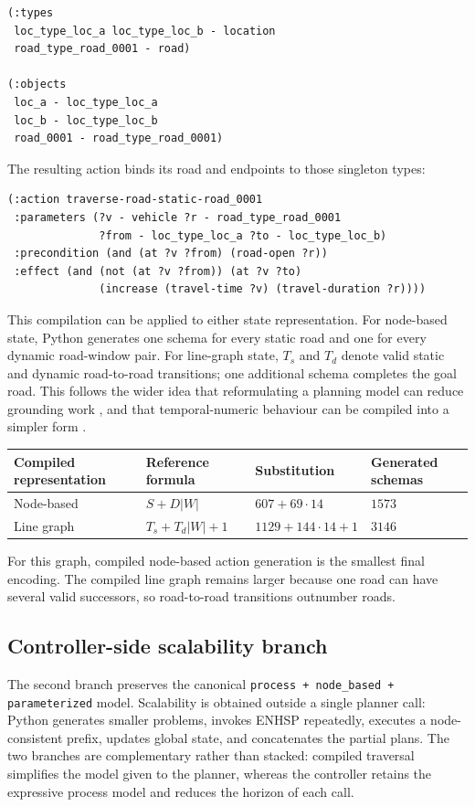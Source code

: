 \documentclass[10pt]{article}
\begin{document}
\begin{lstlisting}
(:types
 loc_type_loc_a loc_type_loc_b - location
 road_type_road_0001 - road)

(:objects
 loc_a - loc_type_loc_a
 loc_b - loc_type_loc_b
 road_0001 - road_type_road_0001)
\end{lstlisting}

The resulting action binds its road and endpoints to those singleton types:

\begin{lstlisting}
(:action traverse-road-static-road_0001
 :parameters (?v - vehicle ?r - road_type_road_0001
              ?from - loc_type_loc_a ?to - loc_type_loc_b)
 :precondition (and (at ?v ?from) (road-open ?r))
 :effect (and (not (at ?v ?from)) (at ?v ?to)
              (increase (travel-time ?v) (travel-duration ?r))))
\end{lstlisting}

This compilation can be applied to either state representation. For node-based
state, Python generates one schema for every static road and one for every
dynamic road-window pair. For line-graph state, $T_s$ and $T_d$ denote valid
static and dynamic road-to-road transitions; one additional schema completes
the goal road. This follows the wider idea that reformulating a planning model
can reduce grounding work \cite{franco2019}, and that temporal-numeric behaviour
can be compiled into a simpler form \cite{micheli2026}.

\begin{center}
\scriptsize
\begin{tabular}{@{}llll@{}}
\toprule
Compiled representation & Reference formula & Substitution & Generated schemas \\
\midrule
Node-based & $S+D|W|$ & $607+69\cdot14$ & $1573$ \\
Line graph & $T_s+T_d|W|+1$ & $1129+144\cdot14+1$ & $3146$ \\
\bottomrule
\end{tabular}
\end{center}

For this graph, compiled node-based action generation is the smallest final
encoding. The compiled line graph remains larger because one road can have
several valid successors, so road-to-road transitions outnumber roads.

\subsection{Controller-side scalability branch}
The second branch preserves the canonical
\texttt{process + node\_based + parameterized} model. Scalability is obtained
outside a single planner call: Python generates smaller problems, invokes
ENHSP repeatedly, executes a node-consistent prefix, updates global state, and
concatenates the partial plans. The two branches are complementary rather than
stacked: compiled traversal simplifies the model given to the planner, whereas
the controller retains the expressive process model and reduces the horizon of
each call.
\end{document}
